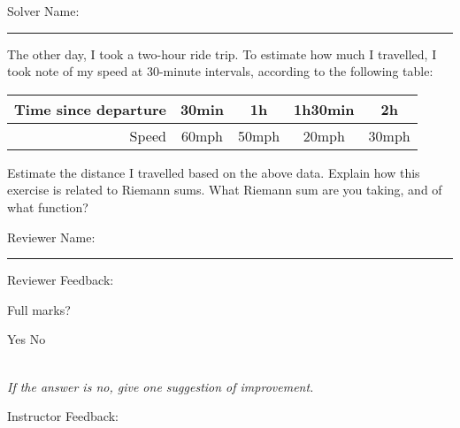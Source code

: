 \documentclass[12pt]{exam}
\begin{document}
\pagestyle{headandfoot}
\firstpageheadrule

Solver Name:\enspace\rule{5cm}{0.8pt}

\begin{questions}
\question

The other day, I took a two-hour ride trip. To estimate how much I travelled, I took note of my speed at 30-minute intervals, according to the following table:
\begin{center}
\begin{tabular}{|r|c|c|c|c|}
\hline
Time since departure & 30min & 1h & 1h30min & 2h\\
\hline
Speed & 60mph & 50mph & 20mph & 30mph\\
\hline
\end{tabular}
\end{center}

Estimate the distance I travelled based on the above data. Explain how this exercise is related to Riemann sums. What Riemann sum are you taking, and of what function?

\end{questions}

Reviewer Name:\enspace\rule{5cm}{0.8pt}

\begin{questions}
\question
Reviewer Feedback:

Full marks? \begin{oneparcheckboxes}
\choice Yes
\choice No
\end{oneparcheckboxes}\\
\textit{If the answer is no, give one suggestion of improvement.}

\question

Instructor Feedback:



\end{questions}
\end{document}
